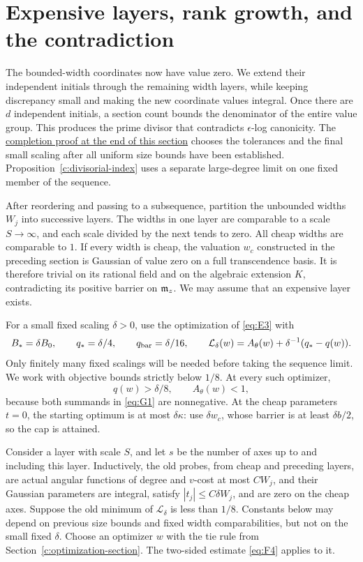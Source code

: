 \section{Expensive layers, rank growth, and the contradiction}
\label{c:rank-section}

The bounded-width coordinates now have value zero. We extend their
independent initials through the remaining width layers, while keeping
discrepancy small and making the new coordinate values integral. Once
there are $d$ independent initials, a section count bounds the denominator
of the entire value group. This produces the prime divisor that contradicts
$\epsilon$-log canonicity. The
\hyperref[c:choice-order]{completion proof at the end of this section}
chooses the tolerances and the final small scaling after all uniform size
bounds have been established. Proposition~\ref{c:divisorial-index} uses a
separate large-degree limit on one fixed member of the sequence.

After reordering and passing to a subsequence, partition the
unbounded widths \(W_j\) into successive layers.  The widths in
one layer are comparable to a scale \(S\to\infty\), and each
scale divided by the next tends to zero.  All cheap widths are
comparable to \(1\).  If every width is cheap, the valuation
\(w_c\) constructed in the preceding section is Gaussian of
value zero on a full transcendence basis.  It is therefore
trivial on its rational field and on the algebraic extension
\(K\), contradicting its positive barrier on \(\mathfrak m_z\).
We may assume that an expensive layer exists.

For a small fixed scaling \(\delta>0\), use the optimization of
\eqref{eq:E3} with
\begin{equation}\label{eq:G1}
 B_*=\delta B_0,\qquad q_*=\delta/4,\qquad
 q_{\rm bar}=\delta/16,\qquad
 \mathcal L_\delta(w)=A_\theta(w)+\delta^{-1}(q_*-q(w)).
\end{equation}
Only finitely many fixed scalings will be needed before taking
the sequence limit.  We work with objective bounds strictly
below \(1/8\).  At every such optimizer,
\[
                         q(w)>\delta/8,\qquad A_\theta(w)<1,
\]
because both summands in \eqref{eq:G1} are nonnegative.
At the cheap parameters \(t=0\), the starting optimum is at
most \(\delta\kappa\): use \(\delta w_c\), whose barrier is
at least \(\delta b/2\), so the cap is attained.

Consider a layer with scale \(S\), and let \(s\) be the number
of axes up to and including this layer.  Inductively, the old
probes, from cheap and preceding layers, are actual angular
functions of degree and \(v\)-cost at most \(C W_j\), and their
Gaussian parameters are integral, satisfy
\(|t_j|\le C\delta W_j\), and are zero on the cheap axes.
Suppose the old minimum of \(\mathcal L_\delta\) is less than \(1/8\).
Constants below may depend on previous size bounds and fixed
width comparabilities, but not on the small fixed \(\delta\).
Choose an optimizer \(w\) with the tie rule from
Section~\ref{c:optimization-section}.  The two-sided estimate
\eqref{eq:F4} applies to it.

